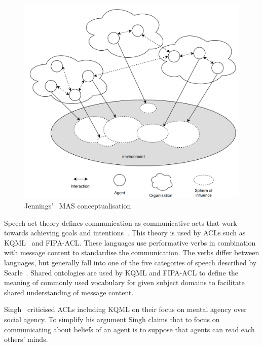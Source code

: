 \documentclass[]{final_report}
\begin{document}
\begin{figure}
\vspace{-20pt}
\begin{framed}
\centering
	\includegraphics[width=\textwidth]{JenningsMAS.png}
	\caption{Jennings'~\cite{jennings2000agent} MAS conceptualisation}
	\label{fig:jenningsmas}
\end{framed}
\vspace{-30pt}
\end{figure}
Speech act theory defines communication as communicative acts that work towards achieving goals and intentions~\cite{austin1975things}. This theory is used by ACLs such as KQML~\cite{finin1994kqml} and FIPA-ACL. These languages use performative verbs in combination with message content to standardise the communication. The verbs differ between languages, but generally fall into one of the five categories of speech described by Searle~\cite{searle1969speech}. Shared ontologies are used by KQML and FIPA-ACL to define the meaning of commonly used vocabulary for given subject domains to facilitate shared understanding of message content.\par 
Singh~\cite{singh1998agent} criticised ACLs including KQML on their focus on mental agency over social agency. To simplify his argument Singh claims that to focus on communicating about beliefs of an agent is to suppose that agents can read each others' minds.
\end{document}
